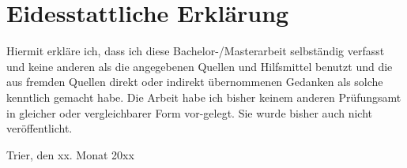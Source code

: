 \thispagestyle{empty}
\par


\chapter*{Eidesstattliche Erklärung}

Hiermit erkläre ich, dass ich diese Bachelor-/Masterarbeit selbständig verfasst und keine anderen als die angegebenen Quellen und Hilfsmittel benutzt und die aus fremden Quellen direkt oder indirekt übernommenen Gedanken als solche kenntlich gemacht habe. Die Arbeit habe ich bisher keinem anderen Prüfungsamt in gleicher oder vergleichbarer Form vor-gelegt. Sie wurde bisher auch nicht veröffentlicht.

Trier, den xx. Monat 20xx

\clearpage






